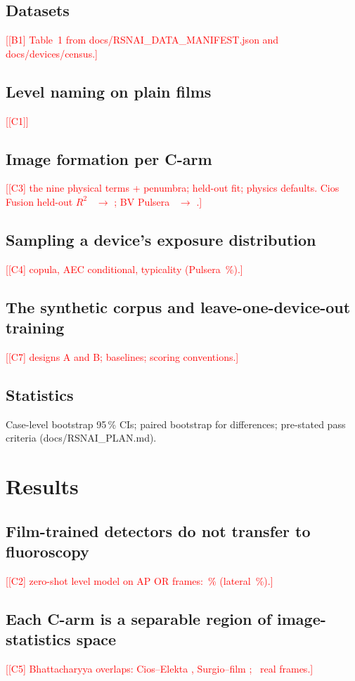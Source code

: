 \documentclass[11pt]{article}
\newcommand{\todo}[1]{\textcolor{red}{[#1]}}
\begin{document}
\subsection{Datasets}
\todo{[B1] Table~1 from docs/RSNAI\_DATA\_MANIFEST.json and docs/devices/census.}
\subsection{Level naming on plain films}
\todo{[C1]}
\subsection{Image formation per C-arm}
\todo{[C3] the nine physical terms + penumbra; held-out fit; physics defaults. Cios Fusion held-out $R^2$ \clCardCiosRTwoBaseline\ $\rightarrow$ \clCardCiosRTwoHeldout; BV Pulsera \clCardPulseraRTwoBaseline\ $\rightarrow$ \clCardPulseraRTwoHeldout.}
\subsection{Sampling a device's exposure distribution}
\todo{[C4] copula, AEC conditional, typicality (Pulsera \clCardPulseraTypicalityNineNine\,\%).}
\subsection{The synthetic corpus and leave-one-device-out training}
\todo{[C7] designs A and B; baselines; scoring conventions.}
\subsection{Statistics}
Case-level bootstrap 95\,\% CIs; paired bootstrap for differences; pre-stated pass criteria (docs/RSNAI\_PLAN.md).

\section{Results}
\subsection{Film-trained detectors do not transfer to fluoroscopy}
\todo{[C2] zero-shot level model on AP OR frames: \clCarmZeroshotApWholeExact\,\% (lateral \clCarmZeroshotLatWholeExact\,\%).}
\subsection{Each C-arm is a separable region of image-statistics space}
\todo{[C5] Bhattacharyya overlaps: Cios--Elekta \clManifoldOverlapCiosElekta, Surgio--film \clManifoldOverlapSurgioFilm; \clManifoldNReal\ real frames.}
\end{document}
